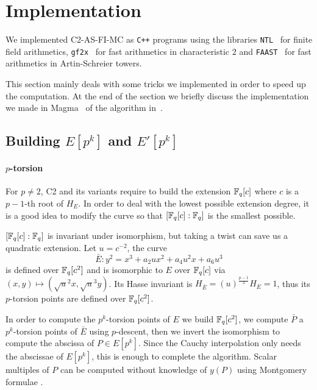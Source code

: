 \section{Implementation}
\label{sec:implementation}

We implemented C2-AS-FI-MC as \texttt{C++} programs using the
libraries \texttt{NTL}~\cite{NTL} for finite field arithmetics,
\texttt{gf2x}~\cite{gf2x} for fast arithmetics in characteristic $2$
and \texttt{FAAST}~\cite{DFS09} for fast arithmetics in Artin-Schreier
towers.

This section mainly deals with some tricks we implemented in order to
speed up the computation. At the end of the section we briefly discuss
the implementation we made in Magma~\cite{MAGMA} of the algorithm
in~\cite{LeSi09}.

\subsection{Building $E[p^k]$ and $E'[p^k]$}
\label{sec:impl:torsion}

\paragraph{$p$-torsion}
For $p\ne2$, C2 and its variants require to build the extension
$\mathbb{F}_q[c]$ where $c$ is a $p-1$-th root of $H_E$. In order to deal with
the lowest possible extension degree, it is a good idea to modify the
curve so that $[\mathbb{F}_q[c]:\mathbb{F}_q]$ is the smallest possible.

$[\mathbb{F}_q[c]:\mathbb{F}_q]$ is invariant under isomorphism, but taking a twist
can save us a quadratic extension. Let $u=c^{-2}$, the curve
\begin{equation*}
  \bar{E} : y^2 = x^3 + a_2ux^2 + a_4u^2x + a_6u^3
\end{equation*}
is defined over $\mathbb{F}_q[c^2]$ and is isomorphic to $E$ over $\mathbb{F}_q[c]$
via $(x,y)\mapsto(\sqrt{u}^2x,\sqrt{u}^3y)$. Its Hasse invariant is
$H_{\bar{E}} = (u)^{\frac{p-1}{2}}H_E = 1$, thus its $p$-torsion
points are defined over $\mathbb{F}_q[c^2]$.

In order to compute the $p^k$-torsion points of $E$ we build
$\mathbb{F}_q[c^2]$, we compute $\bar{P}$ a $p^k$-torsion points of $\bar{E}$
using $p$-descent, then we invert the isomorphism to compute the
abscissa of $P\in E[p^k]$. Since the Cauchy interpolation only needs
the abscissae of $E[p^k]$, this is enough to complete the
algorithm. Scalar multiples of $P$ can be computed without knowledge
of $y(P)$ using Montgomery formulae \cite{Mon87}.

